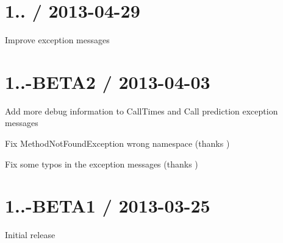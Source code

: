 \section*{1.. / 2013-\/04-\/29 }


\begin{DoxyItemize}
\item Improve exception messages
\end{DoxyItemize}

\section*{1..-\/\+B\+E\+T\+A2 / 2013-\/04-\/03 }


\begin{DoxyItemize}
\item Add more debug information to Call\+Times and Call prediction exception messages
\item Fix Method\+Not\+Found\+Exception wrong namespace (thanks )
\item Fix some typos in the exception messages (thanks )
\end{DoxyItemize}

\section*{1..-\/\+B\+E\+T\+A1 / 2013-\/03-\/25 }


\begin{DoxyItemize}
\item Initial release 
\end{DoxyItemize}